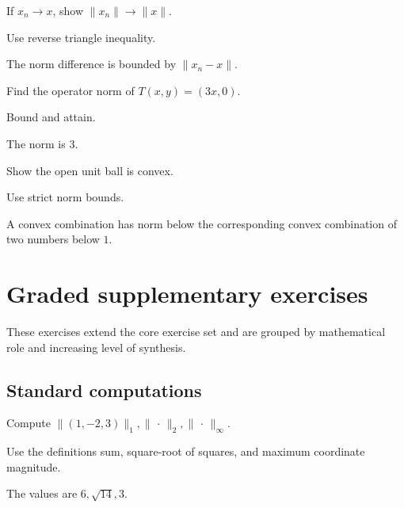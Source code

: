 \begin{exercise}\label{exr:ii02-06}
If $x_n\to x$, show $\|x_n\|\to\|x\|$.
\end{exercise}
\begin{hint}
Use reverse triangle inequality.
\end{hint}
\begin{solution}
The norm difference is bounded by $\|x_n-x\|$.
\end{solution}

\begin{exercise}\label{exr:ii02-07}
Find the operator norm of $T(x,y)=(3x,0)$.
\end{exercise}
\begin{hint}
Bound and attain.
\end{hint}
\begin{solution}
The norm is $3$.
\end{solution}

\begin{exercise}\label{exr:ii02-08}
Show the open unit ball is convex.
\end{exercise}
\begin{hint}
Use strict norm bounds.
\end{hint}
\begin{solution}
A convex combination has norm below the corresponding convex combination of two numbers below $1$.
\end{solution}


\section{Graded supplementary exercises}
These exercises extend the core exercise set and are grouped by mathematical role and increasing level of synthesis.

\subsection*{Standard computations}

\begin{exercise}\label{exr:ii02-expand-01}
Compute \(\|(1,-2,3)\|_1,\|\,\cdot\,\|_2,\|\,\cdot\,\|_\infty\).
\end{exercise}
\begin{hint}
Use the definitions sum, square-root of squares, and maximum coordinate magnitude.
\end{hint}
\begin{solution}
The values are \(6,\sqrt{14},3\).
\end{solution}

